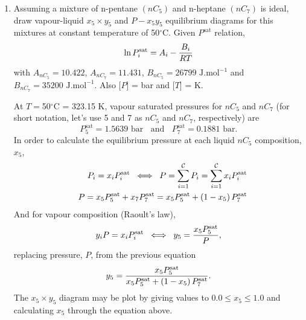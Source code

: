 \begin{enumerate}[1)] 
   \item\label{Mod04Ex01} Assuming a mixture of n-pentane $\left(nC_{5}\right)$ and n-heptane $\left(nC_{7}\right)$ is ideal, draw vapour-liquid $x_{5}\times y_{5}$ and $P-x_{5}y_{5}$ equilibrium diagrams for this mixtures at constant temperature of 50$^{\circ}$C. Given $P^{\text{sat}}$ relation,
    \begin{displaymath}
      \ln{P_{i}^{\text{sat}}} = A_{i} - \frc{B_{i}}{RT}
    \end{displaymath}
    with $A_{nC_{5}}=10.422$, $A_{nC_{7}}=11.431$, $B_{nC_{5}}=26799 \text{ J.mol}^{-1}$ and $B_{nC_{7}}=35200 \text{ J.mol}^{-1}$. Also [$P$] = bar and [$T$] = K.

  At $T=$50$^{\circ}$C = 323.15 K, vapour saturated pressures for $nC_{5}$ and $nC_{7}$ (for short notation, let's use 5 and 7 as $nC_{5}$ and $nC_{7}$, respectively) are
           \begin{displaymath}
              P_{5}^{\text{sat}} = 1.5639\text{ bar}\;\;\text{ and }\;\;P_{7}^{\text{sat}} = 0.1881\text{ bar}.
           \end{displaymath}
           In order to calculate the equilibrium pressure at each liquid $nC_{5}$ composition, $x_{5}$,
           \begin{eqnarray}
               && P_{i} = x_{i}P_{i}^{\text{sat}} \;\;\Longleftrightarrow \;\; P = \summation[P_{i}]{i=1}{\mathcal{C}} = \summation[x_{i}P_{i}^{\text{sat}}]{i=1}{\mathcal{C}} \nonumber \\
               && P = x_{5}P_{5}^{\text{sat}} + x_{7}P_{7}^{\text{sat}} = x_{5}P_{5}^{\text{sat}} + \left(1-x_{5}\right)P_{7}^{\text{sat}} \nonumber 
           \end{eqnarray}
           And for vapour composition (Raoult's law),
           \begin{displaymath}
               y_{i} P = x_{i}P_{i}^{\text{sat}}  \;\;\Longleftrightarrow \;\; y_{5} = \frc{x_{5}P_{5}^{\text{sat}}}{P},
           \end{displaymath}
           replacing pressure, $P$, from the previous equation
           \begin{displaymath}
               y_{5} = \frc{x_{5}P_{5}^{\text{sat}}}{x_{5}P_{5}^{\text{sat}} + \left(1-x_{5}\right)P_{7}^{\text{sat}}}.
           \end{displaymath}
           The $x_{5} \times y_{5}$ diagram may be plot by giving values to $0.0\leq x_{5} \leq 1.0$ and calculating $x_{5}$ through the equation above.


\end{enumerate}
